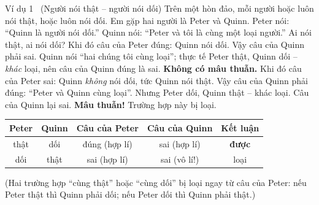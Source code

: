 \begin{exbox}{Ví dụ 1 \ (Người nói thật -- người nói dối)}
Trên một hòn đảo, mỗi người hoặc luôn nói thật, hoặc luôn nói dối. Em gặp hai người là Peter và Quinn.
Peter nói: ``Quinn là người nói dối.'' Quinn nói: ``Peter và tôi là cùng một loại người.''
Ai nói thật, ai nói dối?
\guide
{}
Khi đó câu của Peter đúng: Quinn nói dối. Vậy câu của Quinn phải sai. Quinn nói ``hai chúng tôi cùng loại''; thực tế Peter thật,
Quinn dối -- \emph{khác} loại, nên câu của Quinn đúng là sai. \textbf{Không có mâu thuẫn.}
Khi đó câu của Peter sai: Quinn \emph{không} nói dối, tức Quinn nói thật. Vậy câu của Quinn phải đúng: ``Peter và Quinn cùng loại''.
Nhưng Peter dối, Quinn thật -- khác loại. Câu của Quinn lại sai. \textbf{Mâu thuẫn!} Trường hợp này bị loại.
\begin{center}
\begin{tabular}{|c|c|c|c|c|}
\hline
\rowcolor{tmBlue!10} Peter & Quinn & Câu của Peter & Câu của Quinn & Kết luận \\ \hline
thật & dối & đúng (hợp lí) & sai (hợp lí) & \textcolor{tmGreen!70!black}{\textbf{được}} \\ \hline
dối & thật & sai (hợp lí) & sai (vô lí!) & \textcolor{AnsRed}{loại} \\ \hline
\end{tabular}
\end{center}
(Hai trường hợp ``cùng thật'' hoặc ``cùng dối'' bị loại ngay từ câu của Peter: nếu Peter thật thì Quinn phải dối; nếu Peter dối thì Quinn phải thật.)
\end{exbox}

